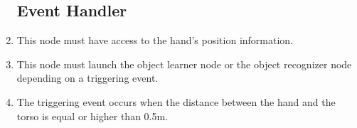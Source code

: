 \documentclass{article}
\makeatletter
\def\threedigits#1{\expandafter\@threedigits\csname c@#1\endcsname}
\def\@threedigits#1{%
  \ifnum#1<100 0\fi
  \ifnum#1<10 0\fi
  \number#1}
\makeatother
\begin{document}
\begin{center}
\begin{enumerate}[label=\textbf{FR\threedigits*}, leftmargin=2cm]
		
	


 
\subsection{Event Handler}
\item This node must have access to the hand's position information. 
\item This node must launch the object learner node or the object recognizer node depending on a triggering event. 
\item The triggering event occurs when the distance between the hand and the torso is equal or higher than 0.5m.   
 




\end{enumerate}
\end{center}
\end{document}
